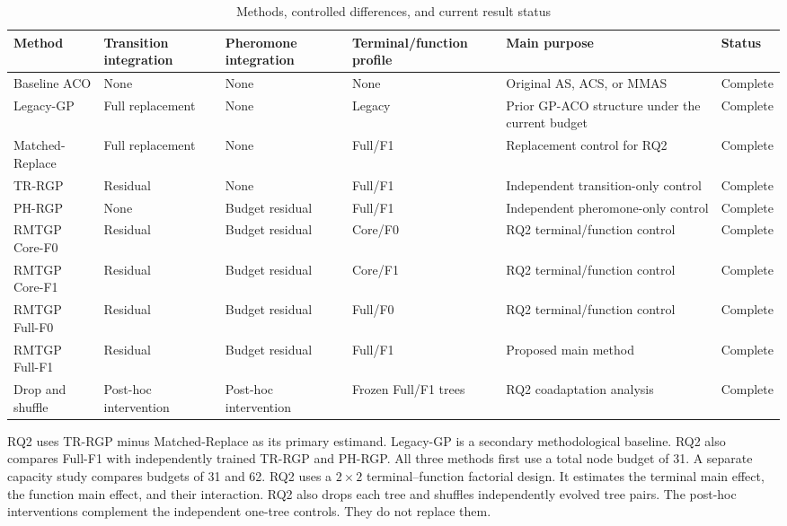\documentclass[letterpaper,journal]{IEEEtran}
\begin{document}
\begin{table}[t]
\caption{Methods, controlled differences, and current result status}
\label{tab:methods}
\centering
\footnotesize
\renewcommand{\arraystretch}{1.15}
\begin{tabular}{L{22mm}L{24mm}L{24mm}L{24mm}L{42mm}L{15mm}}
\toprule
Method & Transition integration & Pheromone integration & Terminal/function profile & Main purpose & Status\\
\midrule
Baseline ACO & None & None & None & Original AS, ACS, or MMAS & Complete\\
Legacy-GP & Full replacement & None & Legacy & Prior GP-ACO structure under the current budget & Complete\\
Matched-Replace & Full replacement & None & Full/F1 & Replacement control for RQ2 & Complete\\
TR-RGP & Residual & None & Full/F1 & Independent transition-only control & Complete\\
PH-RGP & None & Budget residual & Full/F1 & Independent pheromone-only control & Complete\\
RMTGP Core-F0 & Residual & Budget residual & Core/F0 & RQ2 terminal/function control & Complete\\
RMTGP Core-F1 & Residual & Budget residual & Core/F1 & RQ2 terminal/function control & Complete\\
RMTGP Full-F0 & Residual & Budget residual & Full/F0 & RQ2 terminal/function control & Complete\\
RMTGP Full-F1 & Residual & Budget residual & Full/F1 & Proposed main method & Complete\\
Drop and shuffle & Post-hoc intervention & Post-hoc intervention & Frozen Full/F1 trees & RQ2 coadaptation analysis & Complete\\
\bottomrule
\end{tabular}
\end{table}

RQ2 uses TR-RGP minus Matched-Replace as its primary estimand.
Legacy-GP is a secondary methodological baseline.
RQ2 also compares Full-F1 with independently trained TR-RGP and PH-RGP.
All three methods first use a total node budget of 31.
A separate capacity study compares budgets of 31 and 62.
RQ2 uses a \(2\times2\) terminal--function factorial design.
It estimates the terminal main effect, the function main effect, and their interaction.
RQ2 also drops each tree and shuffles independently evolved tree pairs.
The post-hoc interventions complement the independent one-tree controls.
They do not replace them.
\end{document}
